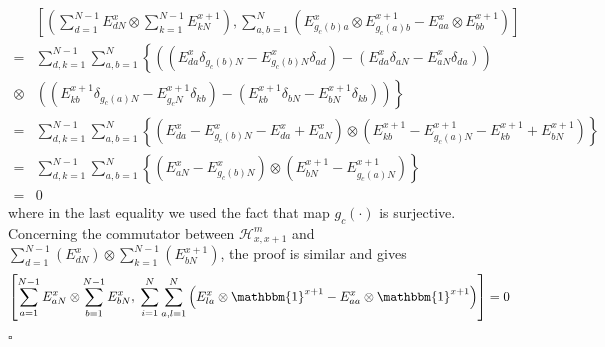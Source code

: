 \documentclass[10pt]{article}
\numberwithin{equation}{section}
\numberwithin{equation}{subsection}
\begin{document}
\begin{align*}
	&\left[\left(\sum_{d=1}^{N-1}E_{dN}^{x}\otimes\sum_{k=1}^{N-1}E_{kN}^{x+1}\right), \sum_{a,b=1}^{N}\left(E_{g_{c}(b)a}^{x}\otimes E_{g_{c}(a)b}^{x+1} -E_{aa}^{x}\otimes E_{bb}^{x+1}\right)\right]
	\\=&
	\sum_{d,k=1}^{N-1}\sum_{a,b=1}^{N}\left\{\left((E_{da}^{x}\delta_{g_{c}(b)N}-E_{g_{c}(b)N}^{x}\delta_{ad})-(E_{da}^{x}\delta_{aN}-E_{aN}^{x}\delta_{da})\right)\right. \\ \otimes&\left. \left((E_{kb}^{x+1}\delta_{g_{c}(a)N}-E_{g_{c}N}^{x+1}\delta_{kb})-(E_{kb}^{x+1}\delta_{bN}-E_{bN}^{x+1}\delta_{kb})\right)\right\}
	\\=&
	\sum_{d,k=1}^{N-1}\sum_{a,b=1}^{N}\left\{\left(E_{da}^{x}-E_{g_{c}(b)N}^{x}-E_{da}^{x}+E_{aN}^{x}\right)\otimes\left(E_{kb}^{x+1}-E_{g_{c}(a)N}^{x+1}-E_{kb}^{x+1}+E_{bN}^{x+1}\right)\right\}
	\\=&
	\sum_{d,k=1}^{N-1}\sum_{a,b=1}^{N}\left\{\left(E_{aN}^{x}-E_{g_{c}(b)N}^{x}\right)\otimes \left(E_{bN}^{x+1}-E_{g_{c}(a)N}^{x+1}\right)\right\}
	\\=&0
\end{align*}
where in the last equality we used the fact that map $g_{c}(\cdot)$ is surjective. \\
Concerning the commutator between $\mathcal{H}_{x,x+1}^{m}$ and $\sum_{d=1}^{N-1}(E_{dN}^{x})\otimes \sum_{k=1}^{N-1}(E_{bN}^{x+1})$, the proof is similar and gives
\begin{equation}
	\left[\sum_{a=1}^{N-1}E_{aN}^{x}\otimes \sum_{b=1}^{N-1}E_{bN}^{x},\;\sum_{i=1}^{N}\sum_{a,l=1}^{N}\left(E_{la}^{x}\otimes \mathbbm{1}^{x+1}-E_{aa}^{x}\otimes \mathbbm{1}^{x+1}\right)\right]=0
\end{equation}
\begin{flushright}
	$\square$
\end{flushright}
\end{document}

